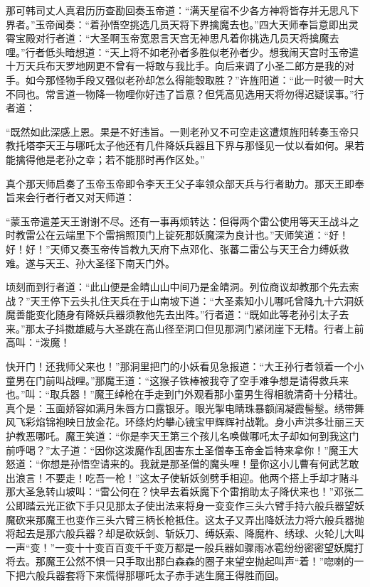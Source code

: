 \documentclass[12pt,UTF8]{ctexbook}
\begin{document}
那可韩司丈人真君历历查勘回奏玉帝道：“满天星宿不少各方神将皆存并无思凡下界者。”玉帝闻奏：“着孙悟空挑选几员天将下界擒魔去也。”四大天师奉旨意即出灵霄宝殿对行者道：“大圣啊玉帝宽恩言天宫无神思凡着你挑选几员天将擒魔去哩。”行者低头暗想道：“天上将不如老孙者多胜似老孙者少。想我闹天宫时玉帝遣十万天兵布天罗地网更不曾有一将敢与我比手。向后来调了小圣二郎方是我的对手。如今那怪物手段又强似老孙却怎么得能彀取胜？”许旌阳道：“此一时彼一时大不同也。常言道一物降一物哩你好违了旨意？但凭高见选用天将勿得迟疑误事。”行者道：

“既然如此深感上恩。果是不好违旨。一则老孙又不可空走这遭烦旌阳转奏玉帝只教托塔李天王与哪吒太子他还有几件降妖兵器且下界与那怪见一仗以看如何。果若能擒得他是老孙之幸；若不能那时再作区处。”

真个那天师启奏了玉帝玉帝即令李天王父子率领众部天兵与行者助力。那天王即奉旨来会行者行者又对天师道：

“蒙玉帝遣差天王谢谢不尽。还有一事再烦转达：但得两个雷公使用等天王战斗之时教雷公在云端里下个雷捎照顶门上锭死那妖魔深为良计也。”天师笑道：“好！好！好！”天师又奏玉帝传旨教九天府下点邓化、张蕃二雷公与天王合力缚妖救难。遂与天王、孙大圣径下南天门外。

顷刻而到行者道：“此山便是金皘山山中间乃是金皘洞。列位商议却教那个先去索战？”天王停下云头扎住天兵在于山南坡下道：“大圣素知小儿哪吒曾降九十六洞妖魔善能变化随身有降妖兵器须教他先去出阵。”行者道：“既如此等老孙引太子去来。”那太子抖擞雄威与大圣跳在高山径至洞口但见那洞门紧闭崖下无精。行者上前高叫：“泼魔！

快开门！还我师父来也！”那洞里把门的小妖看见急报道：“大王孙行者领着一个小童男在门前叫战哩。”那魔王道：“这猴子铁棒被我夺了空手难争想是请得救兵来也。”叫：“取兵器！”魔王绰枪在手走到门外观看那小童男生得相貌清奇十分精壮。真个是：玉面娇容如满月朱唇方口露银牙。眼光掣电睛珠暴额阔凝霞髻髽。绣带舞风飞彩焰锦袍映日放金花。环绦灼灼攀心镜宝甲辉辉衬战靴。身小声洪多壮丽三天护教恶哪吒。魔王笑道：“你是李天王第三个孩儿名唤做哪吒太子却如何到我这门前呼喝？”太子道：“因你这泼魔作乱困害东土圣僧奉玉帝金旨特来拿你！”魔王大怒道：“你想是孙悟空请来的。我就是那圣僧的魔头哩！量你这小儿曹有何武艺敢出浪言！不要走！吃吾一枪！”这太子使斩妖剑劈手相迎。他两个搭上手却才赌斗那大圣急转山坡叫：“雷公何在？快早去着妖魔下个雷捎助太子降伏来也！”邓张二公即踏云光正欲下手只见那太子使出法来将身一变变作三头六臂手持六般兵器望妖魔砍来那魔王也变作三头六臂三柄长枪抵住。这太子又弄出降妖法力将六般兵器抛将起去是那六般兵器？却是砍妖剑、斩妖刀、缚妖索、降魔杵、绣球、火轮儿大叫一声“变！”一变十十变百百变千千变万都是一般兵器如骤雨冰雹纷纷密密望妖魔打将去。那魔王公然不惧一只手取出那白森森的圈子来望空抛起叫声“着！”唿喇的一下把六般兵器套将下来慌得那哪吒太子赤手逃生魔王得胜而回。
\end{document}
